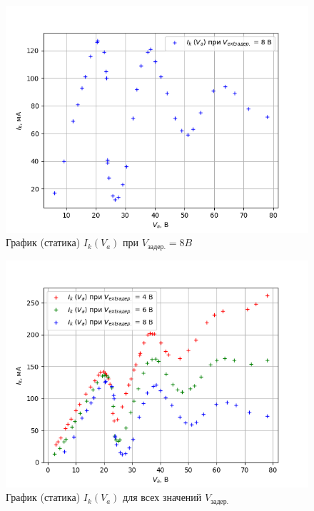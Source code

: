 \documentclass[a4paper, 12pt]{article}%
\begin{document}
\begin{itemize}
\newpage

\ 

\begin{figure}[!h]
    \centering
    \includegraphics[scale=0.55]{graph6.png}
    \caption{График (статика) $I_k(V_a)$ при $V_{\text{задер.}} = 8 B$}
    \label{graph:6}
\end{figure}

\begin{figure}[!h]
    \centering
    \includegraphics[scale=0.55]{all.png}
    \caption{График (статика) $I_k(V_a)$ для всех значений $V_{\text{задер.}}$}
    \label{graph:all}
\end{figure}

\ $\text{ }$


\end{itemize}
\end{document}
